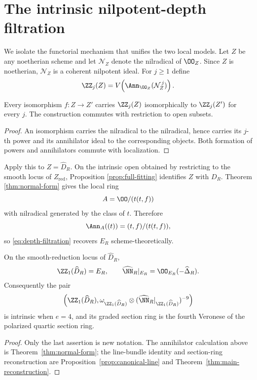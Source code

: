 \section{The intrinsic nilpotent-depth filtration}
\label{sec:depth}

We isolate the functorial mechanism that unifies the two local models.
Let \(Z\) be any noetherian scheme and let \(\mathcal N_Z\) denote the
nilradical of \(\OO_Z\). Since \(Z\) is noetherian,
\(\mathcal N_Z\) is a coherent nilpotent ideal. For \(j\ge1\) define
\begin{equation}\label{eq:depth-filtration}
 \ZZ_j(Z)=
 V\!\left(\Ann_{\OO_Z}(\mathcal N_Z^{\,j})\right).
\end{equation}

\begin{lemma}[Functoriality]\label{lem:depth-functorial}
Every isomorphism \(f:Z\to Z'\) carries
\(\ZZ_j(Z)\) isomorphically to \(\ZZ_j(Z')\) for every \(j\).
The construction commutes with restriction to open subsets.
\end{lemma}
\begin{proof}
An isomorphism carries the nilradical to the nilradical, hence carries
its \(j\)-th power and its annihilator ideal to the corresponding
objects. Both formation of powers and annihilators commute with
localization.
\end{proof}

Apply this to \(Z=\widehat D_R\). On the intrinsic open obtained by
restricting to the smooth locus of \(Z_{\mathrm{red}}\), Proposition
\ref{prop:full-fitting} identifies \(Z\) with \(D_R\). Theorem
\ref{thm:normal-form} gives the local ring
\[
 A=\OO/(t(t,f))
\]
with nilradical generated by the class of \(t\). Therefore
\[
 \Ann_A((t))=(t,f)/(t(t,f)),
\]
so \eqref{eq:depth-filtration} recovers \(E_R\) scheme-theoretically.

\begin{proposition}
\label{prop:depth-one}
On the smooth-reduction locus of \(\widehat D_R\),
\[
 \ZZ_1(\widehat D_R)=E_R,\qquad
 \widehat\NN_R|_{E_R}=\OO_{E_R}(-\widehat\Delta_R).
\]
Consequently the pair
\[
 \left(\ZZ_1(\widehat D_R),
 \omega_{\ZZ_1(\widehat D_R)}
 \otimes
 (\widehat\NN_R|_{\ZZ_1(\widehat D_R)})^{-9}\right)
\]
is intrinsic when \(e=4\), and its graded section ring is the fourth
Veronese of the polarized quartic section ring.
\end{proposition}
\begin{proof}
Only the last assertion is new notation. The annihilator calculation
above is Theorem~\ref{thm:normal-form}; the line-bundle identity and
section-ring reconstruction are Proposition~\ref{prop:canonical-line}
and Theorem~\ref{thm:main-reconstruction}.
\end{proof}


